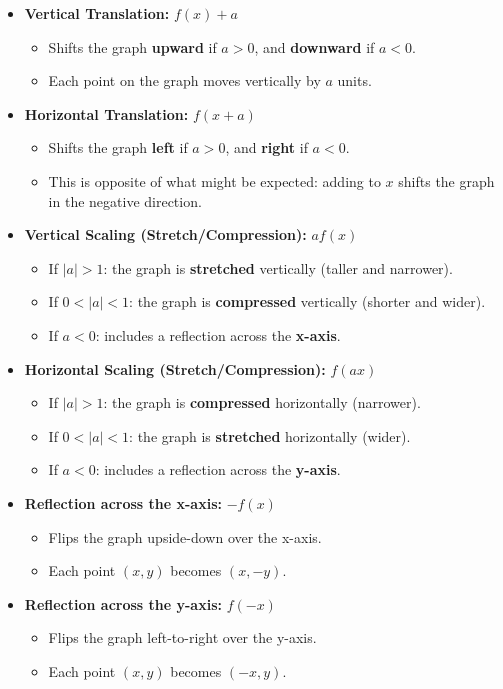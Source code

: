 \begin{itemize}
	\item \textbf{Vertical Translation:} \( f(x) + a \)
	      \begin{itemize}
		      \item Shifts the graph \textbf{upward} if \( a > 0 \), and \textbf{downward} if \( a < 0 \).
		      \item Each point on the graph moves vertically by \( a \) units.
	      \end{itemize}

	\item \textbf{Horizontal Translation:} \( f(x + a) \)
	      \begin{itemize}
		      \item Shifts the graph \textbf{left} if \( a > 0 \), and \textbf{right} if \( a < 0 \).
		      \item This is opposite of what might be expected: adding to \( x \) shifts the graph in the negative direction.
	      \end{itemize}

	\item \textbf{Vertical Scaling (Stretch/Compression):} \( a f(x) \)
	      \begin{itemize}
		      \item If \( |a| > 1 \): the graph is \textbf{stretched} vertically (taller and narrower).
		      \item If \( 0 < |a| < 1 \): the graph is \textbf{compressed} vertically (shorter and wider).
		      \item If \( a < 0 \): includes a reflection across the \textbf{x-axis}.
	      \end{itemize}

	\item \textbf{Horizontal Scaling (Stretch/Compression):} \( f(a x) \)
	      \begin{itemize}
		      \item If \( |a| > 1 \): the graph is \textbf{compressed} horizontally (narrower).
		      \item If \( 0 < |a| < 1 \): the graph is \textbf{stretched} horizontally (wider).
		      \item If \( a < 0 \): includes a reflection across the \textbf{y-axis}.
	      \end{itemize}

	\item \textbf{Reflection across the x-axis:} \( -f(x) \)
	      \begin{itemize}
		      \item Flips the graph upside-down over the x-axis.
		      \item Each point \( (x, y) \) becomes \( (x, -y) \).
	      \end{itemize}

	\item \textbf{Reflection across the y-axis:} \( f(-x) \)
	      \begin{itemize}
		      \item Flips the graph left-to-right over the y-axis.
		      \item Each point \( (x, y) \) becomes \( (-x, y) \).
	      \end{itemize}
\end{itemize}

\newpage